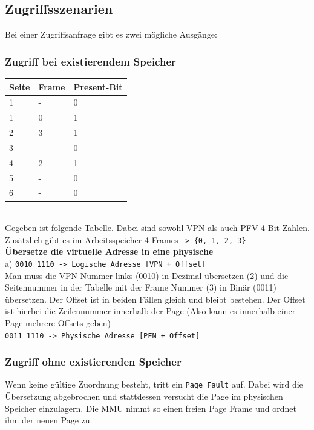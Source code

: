 \documentclass{article}
\begin{document}
	\subsection{Zugriffsszenarien}
	Bei einer Zugriffsanfrage gibt es zwei mögliche Ausgänge:
	\subsubsection{Zugriff bei existierendem Speicher}
	\begin{tabular}{| l | l | l |}
		\toprule
		Seite & Frame & Present-Bit \\ \midrule
		1 & - & 0 \\ \hline
		1 & 0 & 1 \\ \hline
		2 & 3 & 1 \\ \hline
		3 & - & 0 \\ \hline
		4 & 2 & 1 \\ \hline
		5 & - & 0 \\ \hline
		6 & - & 0 \\
		\bottomrule
	\end{tabular} \\
	Gegeben ist folgende Tabelle. Dabei sind sowohl VPN als auch PFV 4 Bit Zahlen. Zusätzlich gibt es im Arbeitsspeicher 4 Frames \verb|-> {0, 1, 2, 3}| \\
	\textbf{\small{Übersetze die virtuelle Adresse in eine physische}} \\
	a) \verb|0010 1110 -> Logische Adresse [VPN + Offset]| \\
	Man muss die VPN Nummer links (0010) in Dezimal übersetzen (2) und die Seitennummer in der Tabelle mit der Frame Nummer (3) in Binär (0011) übersetzen. Der Offset ist in beiden Fällen gleich und bleibt bestehen. Der Offset ist hierbei die Zeilennummer innerhalb der Page (Also kann es innerhalb einer Page mehrere Offsets geben) \\
	\verb|0011 1110 -> Physische Adresse [PFN + Offset]|
	\subsubsection{Zugriff ohne existierenden Speicher}
	Wenn keine gültige Zuordnung besteht, tritt ein \verb|Page Fault| auf. Dabei wird die Übersetzung abgebrochen und stattdessen versucht die Page im physischen Speicher einzulagern. Die MMU nimmt so einen freien Page Frame und ordnet ihm der neuen Page zu.
\end{document}
